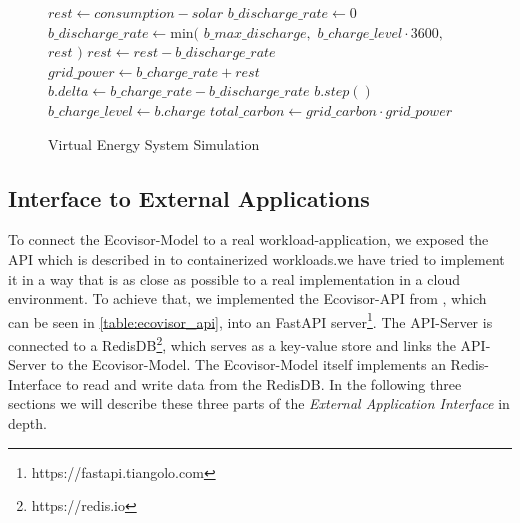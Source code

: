\begin{figure}
    \removelatexerror
    \begin{algorithm}[H]
        \caption{Virtual Energy System Simulation}
        \label{alg:virtual_energy_system_simulation}
        $rest \gets consumption - solar$\;
         {
            $b\_discharge\_rate \gets 0$\;
        }{
            $b\_discharge\_rate \gets \text{min}($\;
            \Indp
                $b\_max\_discharge,$\;
                $b\_charge\_level \cdot 3600,$\;
                $rest$\;
            \Indm
            $)$\;
            $rest \gets rest - b\_discharge\_rate$\;
        }
        $grid\_power \gets b\_charge\_rate + rest$\;
        $b.delta \gets b\_charge\_rate - b\_discharge\_rate$\;
        $b.step()$\;
        $b\_charge\_level \gets b.charge$\;
        $total\_carbon \gets grid\_carbon \cdot grid\_power$\;
        \vspace{3mm}
    \end{algorithm}
\end{figure}

\subsection{Interface to External Applications}

To connect the Ecovisor-Model to a real workload-application, we exposed the API which is described in \cite{souza2023} to containerized workloads.we have tried to implement it in a way that is as close as possible to a real implementation in a cloud environment.
To achieve that, we implemented the Ecovisor-API from \cite{souza2023}, which can be seen in \ref{table:ecovisor_api}, into an FastAPI server\footnote{https://fastapi.tiangolo.com}. %
The API-Server is connected to a RedisDB\footnote{https://redis.io}, which serves as a key-value store and links the API-Server to the Ecovisor-Model.
The Ecovisor-Model itself implements an Redis-Interface to read and write data from the RedisDB.
In the following three sections we will describe these three parts of the \textit{External Application Interface} in depth.

